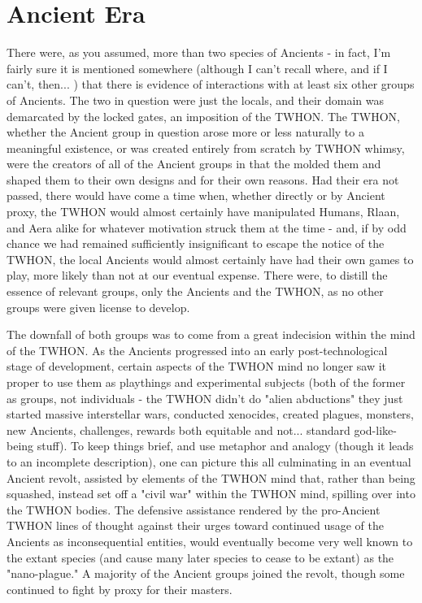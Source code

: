 \section{Ancient Era}
There were, as you assumed, more than two species of Ancients - in
fact, I'm fairly sure it is mentioned somewhere (although I can't
recall where, and if I can't, then... ) that there is evidence of
interactions with at least six other groups of Ancients. The two in
question were just the locals, and their domain was demarcated by the
locked gates, an imposition of the TWHON. The TWHON, whether the
Ancient group in question arose more or less naturally to a meaningful
existence, or was created entirely from scratch by TWHON whimsy, were
the creators of all of the Ancient groups in that the molded them and
shaped them to their own designs and for their own reasons. Had their
era not passed, there would have come a time when, whether directly or
by Ancient proxy, the TWHON would almost certainly have manipulated
Humans, Rlaan, and Aera alike for whatever motivation struck them at
the time - and, if by odd chance we had remained sufficiently
insignificant to escape the notice of the TWHON, the local Ancients
would almost certainly have had their own games to play, more likely
than not at our eventual expense. There were, to distill the essence
of relevant groups, only the Ancients and the TWHON, as no other
groups were given license to develop.

The downfall of both groups was to come from a great indecision within
the mind of the TWHON. As the Ancients progressed into an early
post-technological stage of development, certain aspects of the TWHON
mind no longer saw it proper to use them as playthings and
experimental subjects (both of the former as groups, not individuals -
the TWHON didn't do "alien abductions" they just started massive
interstellar wars, conducted xenocides, created plagues, monsters, new
Ancients, challenges, rewards both equitable and not...  standard
god-like-being stuff). To keep things brief, and use metaphor and
analogy (though it leads to an incomplete description), one can
picture this all culminating in an eventual Ancient revolt, assisted
by elements of the TWHON mind that, rather than being squashed,
instead set off a "civil war" within the TWHON mind, spilling over
into the TWHON bodies. The defensive assistance rendered by the
pro-Ancient TWHON lines of thought against their urges toward
continued usage of the Ancients as inconsequential entities, would
eventually become very well known to the extant species (and cause
many later species to cease to be extant) as the "nano-plague." A
majority of the Ancient groups joined the revolt, though some
continued to fight by proxy for their masters.

